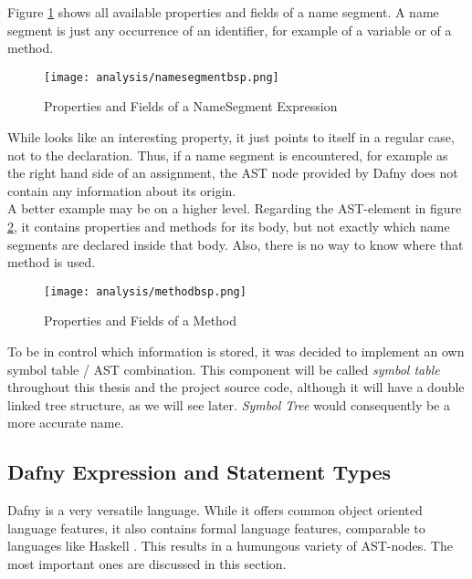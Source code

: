 Figure \ref{fig:namesegment} shows all available properties and fields of a name segment.
A name segment is just any occurrence of an identifier, for example of a variable or of a method.
\begin{figure}[H]
    \centering
    \texttt{[image: analysis/namesegmentbsp.png]}
    \caption{Properties and Fields of a NameSegment Expression}
    \label{fig:namesegment}
\end{figure}
While  looks like an interesting property, it just points to itself in a regular case, not to the declaration.
Thus, if a name segment is encountered, for example as the right hand side of an assignment, the AST node provided by Dafny does not contain any information about its origin.\\

A better example may be on a higher level.
Regarding the AST-element  in figure \ref{fig:method},
it contains properties and methods for its body, but not exactly which name segments are declared inside that body.
Also, there is no way to know where that method is used.

\begin{figure}[H]
    \centering
    \texttt{[image: analysis/methodbsp.png]}
    \caption{Properties and Fields of a Method}
    \label{fig:method}
\end{figure}

To be in control which information is stored, it was decided to implement an own symbol table / AST combination.
This component will be called \textit{symbol table} throughout this thesis and the project source code, although it will have a double linked tree structure, as we will see later.
\textit{Symbol Tree} would consequently be a more accurate name.



\subsection{Dafny Expression and Statement Types}
\label{section:analysis_dafnyASTStuff}
Dafny is a very versatile language.
While it offers common object oriented language features, it also contains formal language features, comparable to languages like Haskell \cite{haskell}.
This results in a humungous variety of AST-nodes.
The most important ones are discussed in this section.\\

